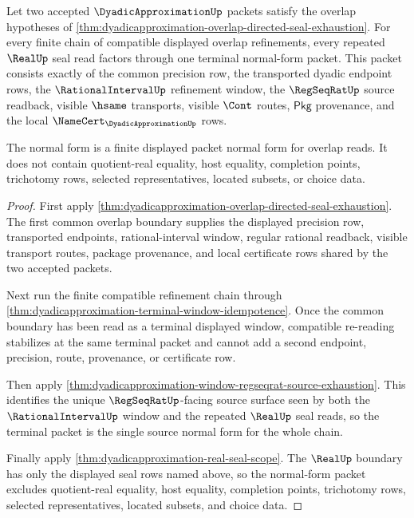 \begin{theorem}\label{thm:dyadicapproximation-overlap-refinement-chain-normal-form}
Let two accepted $\DyadicApproximationUp$ packets satisfy the overlap
hypotheses of \autoref{thm:dyadicapproximation-overlap-directed-seal-exhaustion}.
For every finite chain of compatible displayed overlap refinements, every
repeated $\RealUp$ seal read factors through one terminal normal-form packet.
This packet consists exactly of the common precision row, the transported
dyadic endpoint rows, the $\RationalIntervalUp$ refinement window, the
$\RegSeqRatUp$ source readback, visible $\hsame$ transports, visible $\Cont$
routes, $\mathsf{Pkg}$ provenance, and the local
$\NameCert_{\DyadicApproximationUp}$ rows.

The normal form is a finite displayed packet normal form for overlap reads. It
does not contain quotient-real equality, host equality, completion points,
trichotomy rows, selected representatives, located subsets, or choice data.
\end{theorem}
\begin{proof}
First apply
\autoref{thm:dyadicapproximation-overlap-directed-seal-exhaustion}. The first
common overlap boundary supplies the displayed precision row, transported
endpoints, rational-interval window, regular rational readback, visible
transport routes, package provenance, and local certificate rows shared by the
two accepted packets.

Next run the finite compatible refinement chain through
\autoref{thm:dyadicapproximation-terminal-window-idempotence}. Once the common
boundary has been read as a terminal displayed window, compatible re-reading
stabilizes at the same terminal packet and cannot add a second endpoint,
precision, route, provenance, or certificate row.

Then apply
\autoref{thm:dyadicapproximation-window-regseqrat-source-exhaustion}. This
identifies the unique $\RegSeqRatUp$-facing source surface seen by both the
$\RationalIntervalUp$ window and the repeated $\RealUp$ seal reads, so the
terminal packet is the single source normal form for the whole chain.

Finally apply \autoref{thm:dyadicapproximation-real-seal-scope}. The
$\RealUp$ boundary has only the displayed seal rows named above, so the
normal-form packet excludes quotient-real equality, host equality, completion
points, trichotomy rows, selected representatives, located subsets, and choice
data.
\end{proof}

